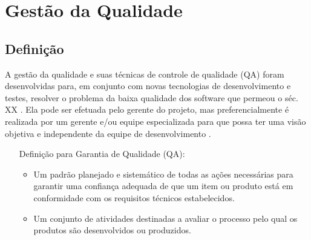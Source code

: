 \documentclass[
	12pt,				%
	openright,			%
	oneside,			%
	a4paper,			%
	english,			%
	brazil,				%
	]{abntex2}
\begin{document}
\chapter{Gestão da Qualidade}

\section{Definição}
A gestão da qualidade e suas técnicas de controle de qualidade (QA) foram desenvolvidas para, em conjunto com novas tecnologias de desenvolvimento e testes, resolver o problema da baixa qualidade dos software que permeou o séc. XX \cite{SOMMERVILLE2011}. Ela pode ser efetuada pelo gerente do projeto, mas preferencialmente é realizada por um gerente e/ou equipe especializada para que possa ter uma visão objetiva e independente da equipe de desenvolvimento \cite{SOMMERVILLE2011}. %

\begin{itemize}
    \item[Definição \citeonline{IEEE1990} para Garantia de Qualidade (QA):] \hfill
        \begin{itemize}
            \item Um padrão planejado e sistemático de todas as ações necessárias para garantir uma confiança adequada de que um item ou produto está em conformidade com os requisitos técnicos estabelecidos.
            \item Um conjunto de atividades destinadas a avaliar o processo pelo qual os produtos são desenvolvidos ou produzidos.
        \end{itemize}
\end{itemize}
\end{document}
